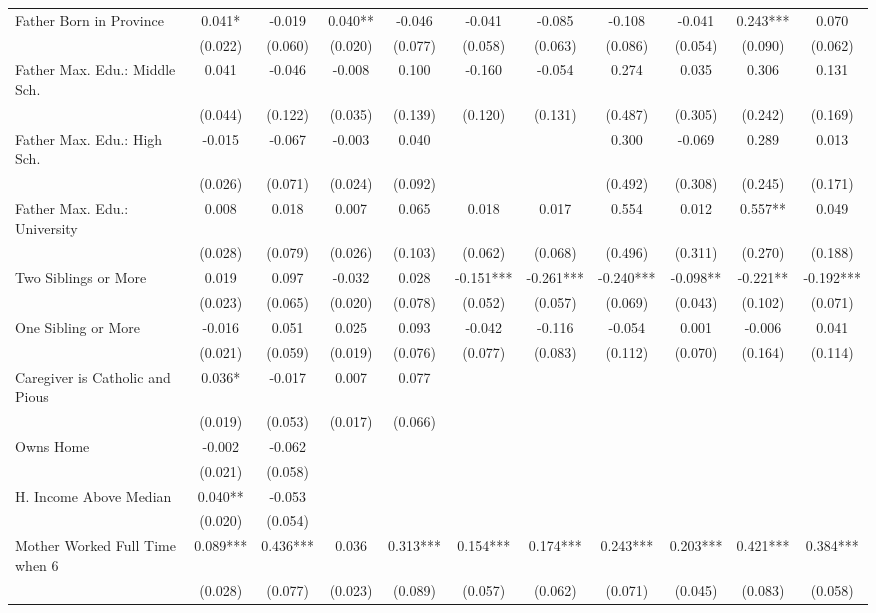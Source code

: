 \begin{tabular}{lcccccccccc}
Father Born in Province & 0.041* & -0.019 & 0.040** & -0.046 & -0.041 & -0.085 & -0.108 & -0.041 & 0.243*** & 0.070 \\
 & (0.022) & (0.060) & (0.020) & (0.077) & (0.058) & (0.063) & (0.086) & (0.054) & (0.090) & (0.062) \\
Father Max. Edu.: Middle Sch. & 0.041 & -0.046 & -0.008 & 0.100 & -0.160 & -0.054 & 0.274 & 0.035 & 0.306 & 0.131 \\
 & (0.044) & (0.122) & (0.035) & (0.139) & (0.120) & (0.131) & (0.487) & (0.305) & (0.242) & (0.169) \\
Father Max. Edu.: High Sch. & -0.015 & -0.067 & -0.003 & 0.040 &  &  & 0.300 & -0.069 & 0.289 & 0.013 \\
 & (0.026) & (0.071) & (0.024) & (0.092) &  &  & (0.492) & (0.308) & (0.245) & (0.171) \\
Father Max. Edu.: University & 0.008 & 0.018 & 0.007 & 0.065 & 0.018 & 0.017 & 0.554 & 0.012 & 0.557** & 0.049 \\
 & (0.028) & (0.079) & (0.026) & (0.103) & (0.062) & (0.068) & (0.496) & (0.311) & (0.270) & (0.188) \\
Two Siblings or More & 0.019 & 0.097 & -0.032 & 0.028 & -0.151*** & -0.261*** & -0.240*** & -0.098** & -0.221** & -0.192*** \\
 & (0.023) & (0.065) & (0.020) & (0.078) & (0.052) & (0.057) & (0.069) & (0.043) & (0.102) & (0.071) \\
One Sibling or More & -0.016 & 0.051 & 0.025 & 0.093 & -0.042 & -0.116 & -0.054 & 0.001 & -0.006 & 0.041 \\
 & (0.021) & (0.059) & (0.019) & (0.076) & (0.077) & (0.083) & (0.112) & (0.070) & (0.164) & (0.114) \\
Caregiver is Catholic and Pious & 0.036* & -0.017 & 0.007 & 0.077 &  &  &  &  &  &  \\
 & (0.019) & (0.053) & (0.017) & (0.066) &  &  &  &  &  &  \\
Owns Home & -0.002 & -0.062 &  &  &  &  &  &  &  &  \\
 & (0.021) & (0.058) &  &  &  &  &  &  &  &  \\
H. Income Above Median & 0.040** & -0.053 &  &  &  &  &  &  &  &  \\
 & (0.020) & (0.054) &  &  &  &  &  &  &  &  \\
Mother Worked Full Time when 6 & 0.089*** & 0.436*** & 0.036 & 0.313*** & 0.154*** & 0.174*** & 0.243*** & 0.203*** & 0.421*** & 0.384*** \\
 & (0.028) & (0.077) & (0.023) & (0.089) & (0.057) & (0.062) & (0.071) & (0.045) & (0.083) & (0.058) \\

\end{tabular}
